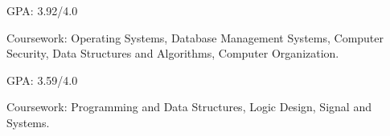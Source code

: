 \newcommand{\TUBentry}{
    \TUB
    \poswithprd{Introduction to 3D Scanning and Printing at TUB Winter University}{Jan 2018-Feb 2018}
    \begin{itemize}
        \item 
        Learned the basic of 3D scanning \& printing. Learned Blender for 3D modeling.
    \end{itemize}
}



\USC
{}

\UM
{}
\begin{miniItemize}
    \item GPA: 3.92/4.0
    \item Coursework: 
        Operating Systems,
        Database Management Systems,
        Computer Security,
        Data Structures and Algorithms,
        Computer Organization.
\end{miniItemize}

\JI
{}
\begin{miniItemize}
    \item GPA: 3.59/4.0
    \item Coursework:
        Programming and Data Structures,
        Logic Design,
        Signal and Systems.
\end{miniItemize}
